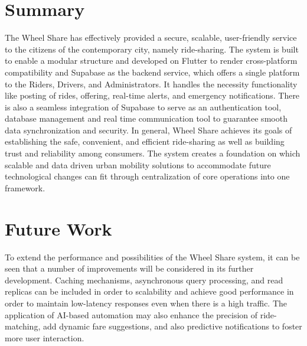 \section{Summary}
The Wheel Share has effectively provided a secure, scalable, user-friendly service to the citizens of the contemporary city, namely ride-sharing. The system is built to enable a modular structure and developed on Flutter to render cross-platform compatibility and Supabase as the backend service, which offers a single platform to the Riders, Drivers, and Administrators. It handles the necessity functionality like posting of rides, offering, real-time alerts, and emergency notifications\cite{mitropoulos2021}. 
There is also a seamless integration of Supabase to serve as an authentication tool, database management and real time communication tool to guarantee smooth data synchronization and security. 
In general, Wheel Share achieves its goals of establishing the safe, convenient, and efficient ride-sharing as well as building trust and reliability among consumers. The system creates a foundation on which scalable and data driven urban mobility solutions to accommodate future technological changes can fit through centralization of core operations into one framework. 

\section{Future Work}
To extend the performance and possibilities of the Wheel Share system, it can be seen that a number of improvements will be considered in its further development. Caching mechanisms, asynchronous query processing, and read replicas can be included in order to scalability and achieve good performance in order to maintain low-latency responses even when there is a high traffic. The application of AI-based automation may also enhance the precision of ride-matching, add dynamic fare suggestions, and also predictive notifications to foster more user interaction\cite{bujak2024}.

\clearpage
